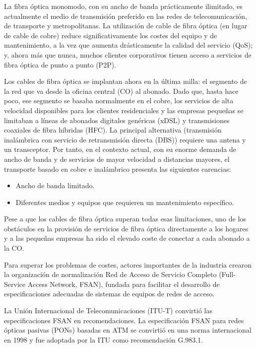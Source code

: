 
\fontsize{13}{14}\selectfont


La fibra óptica monomodo, con su ancho de banda prácticamente ilimitado, es actualmente el medio de transmisión preferido en las redes de telecomunicación, de transporte y metropolitanas. La utilización de cable de fibra óptica (en lugar de cable de cobre) reduce significativamente los costes del equipo y de mantenimiento, a la vez que aumenta drásticamente la calidad del servicio (QoS); y, ahora más que nunca, muchos clientes corporativos tienen acceso a servicios de fibra óptica de punto a punto (P2P).

Los cables de fibra óptica se implantan ahora en la última milla: el segmento de la red que va desde la oficina central (CO) al abonado. Dado que, hasta hace poco, ese segmento se basaba normalmente en el cobre, los servicios de alta velocidad disponibles para los clientes residenciales y las empresas pequeñas se limitaban a líneas de abonados digitales genéricas (xDSL) y transmisiones coaxiales de fibra híbridas (HFC). La principal alternativa (transmisión inalámbrica con servicio de retransmisión directa (DBS)) requiere una antena y un transceptor. Por tanto, en el contexto actual, con su enorme demanda de ancho de banda y de servicios de mayor velocidad a distancias mayores, el transporte basado en cobre e inalámbrico presenta las siguientes carencias:
      

\begin{itemize}
\item Ancho de banda limitado.
\item Diferentes medios y equipos que requieren un mantenimiento específico.
\end{itemize}


Pese a que los cables de fibra óptica superan todas esas limitaciones, uno de los obstáculos en la provisión de servicios de fibra óptica directamente a los hogares y a las pequeñas empresas ha sido el elevado coste de conectar a cada abonado a la CO.

Para superar los problemas de costes, actores importantes de la industria crearon la organización de normalización Red de Acceso de Servicio Completo (Full-Service Access Network, FSAN), fundada para facilitar el desarrollo de especificaciones adecuadas de sistemas de equipos de redes de acceso.

La Unión Internacional de Telecomunicaciones (ITU-T) convirtió las especificaciones FSAN en recomendaciones. La especificación FSAN para redes ópticas pasivas (PONs) basadas en ATM se convirtió en una norma internacional en 1998 y fue adoptada por la ITU como recomendación G.983.1.

